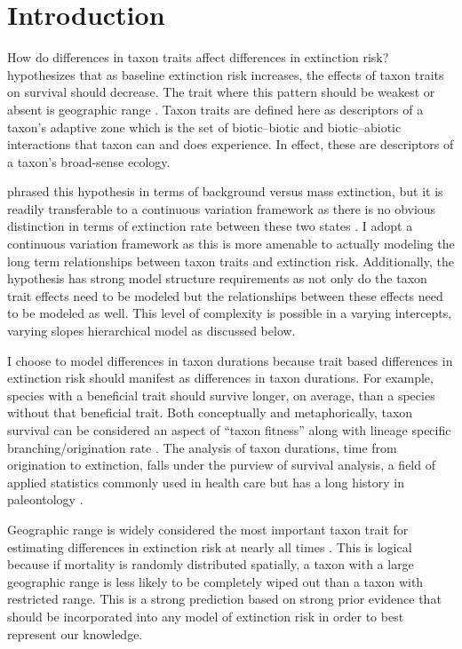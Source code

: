 \documentclass[12pt,letterpaper]{article}
\begin{document}
\section{Introduction}

How do differences in taxon traits affect differences in extinction risk? \citet{Jablonski1986} hypothesizes that as baseline extinction risk increases, the effects of taxon traits on survival should decrease. The trait where this pattern should be weakest or absent is geographic range \citep{Jablonski1986}. Taxon traits are defined here as descriptors of a taxon's adaptive zone which is the set of biotic--biotic and biotic--abiotic interactions that taxon can and does experience. In effect, these are descriptors of a taxon's broad-sense ecology.

\citet{Jablonski1986} phrased this hypothesis in terms of background versus mass extinction, but it is readily transferable to a continuous variation framework as there is no obvious distinction in terms of extinction rate between these two states \citep{Wang2003}. I adopt a continuous variation framework as this is more amenable to actually modeling the long term relationships between taxon traits and extinction risk. Additionally, the \citet{Jablonski1986} hypothesis has strong model structure requirements as not only do the taxon trait effects need to be modeled but the relationships between these effects need to be modeled as well. This level of complexity is possible in a varying intercepts, varying slopes hierarchical model as discussed below.

I choose to model differences in taxon durations because trait based differences in extinction risk should manifest as differences in taxon durations. For example, species with a beneficial trait should survive longer, on average, than a species without that beneficial trait. Both conceptually and metaphorically, taxon survival can be considered an aspect of ``taxon fitness'' along with lineage specific branching/origination rate \citep{Cooper1984,Palmer2012}. The analysis of taxon durations, time from origination to extinction, falls under the purview of survival analysis, a field of applied statistics commonly used in health care \citep{Klein2003} but has a long history in paleontology \citep{Simpson1944,Simpson1953,VanValen1973,VanValen1979}.

Geographic range is widely considered the most important taxon trait for estimating differences in extinction risk at nearly all times \citep{Jablonski1986,Jablonski1987,Jablonski2003,Payne2007}. This is logical because if mortality is randomly distributed spatially, a taxon with a large geographic range is less likely to be completely wiped out than a taxon with restricted range. This is a strong prediction based on strong prior evidence that should be incorporated into any model of extinction risk in order to best represent our knowledge.
\end{document}
